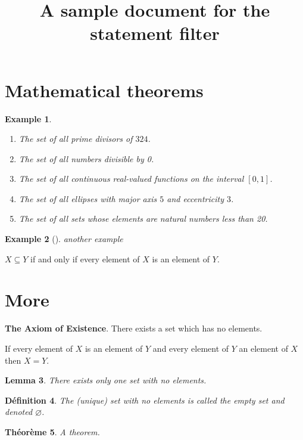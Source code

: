 \documentclass[
]{article}
\title{A sample document for the statement filter}
\author{}
\date{}
\providecommand{\tightlist}{%
  \setlength{\itemsep}{0pt}\setlength{\parskip}{0pt}}
\newtheorem{theorem}{Théorème}[section]
\newtheorem{example}[theorem]{Example}
\newtheorem{lemma}[theorem]{Lemma}
\newtheorem{definition}[theorem]{Définition}
\begin{document}
\maketitle

\hypertarget{mathematical-theorems}{%
\section{Mathematical theorems}\label{mathematical-theorems}}

\begin{example}

\begin{enumerate}
\def\labelenumi{(\alph{enumi})}
\tightlist
\item
  The set of all prime divisors of \(324\).
\item
  The set of all numbers divisible by 0.
\item
  The set of all continuous real-valued functions on the interval
  \([0,1]\).
\item
  The set of all ellipses with major axis \(5\) and eccentricity \(3\).
\item
  The set of all sets whose elements are natural numbers less than 20.
\end{enumerate}

\end{example}

\begin{example}[\citep{reference}]

another example

\end{example}

\(X \subseteq Y\) if and only if every element of \(X\) is an element of
\(Y\).

\hypertarget{more}{%
\section{More}\label{more}}

\textbf{The Axiom of Existence}. There exists a set which has no
elements.

If every element of \(X\) is an element of \(Y\) and every element of
\(Y\) an element of \(X\) then \(X=Y\).

\begin{lemma}

There exists only one set with no elements.

\end{lemma}

\begin{definition}

The (unique) set with no elements is called the empty set and denoted
\(\varnothing\).

\end{definition}

\begin{theorem}

A theorem.

\end{theorem}
\end{document}
